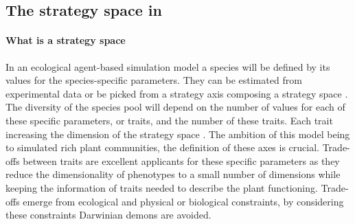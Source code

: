 \subsection{The strategy space in \model}

\paragraph{What is a strategy space}
In an ecological agent-based simulation model a species will be defined by its values for the species-specific parameters. They can be estimated from experimental data \cite{taubert_modelling_2014, maire_traits_2009,lohier_explaining_2014} or be picked from a strategy axis \cite{reineking_environmental_2006, kleidon_global_2000} composing a strategy space \cite{westoby_leaf-height-seed_1998}. The diversity of the species pool will depend on the number of values for each of these specific parameters, or traits, and the number of these traits. Each trait increasing the dimension of the strategy space \cite{laughlin_intrinsic_2014}. The ambition of this model being to simulated rich plant communities, the definition of these axes is crucial. Trade-offs between traits are excellent applicants for these specific parameters as they reduce the dimensionality of phenotypes to a small number of dimensions \cite{wright_worldwide_2004, diaz_global_2016, reich_world-wide_2014} while keeping the information of traits needed to describe the plant functioning. Trade-offs emerge from ecological and physical or biological constraints, by considering these constraints Darwinian demons are avoided.\\

